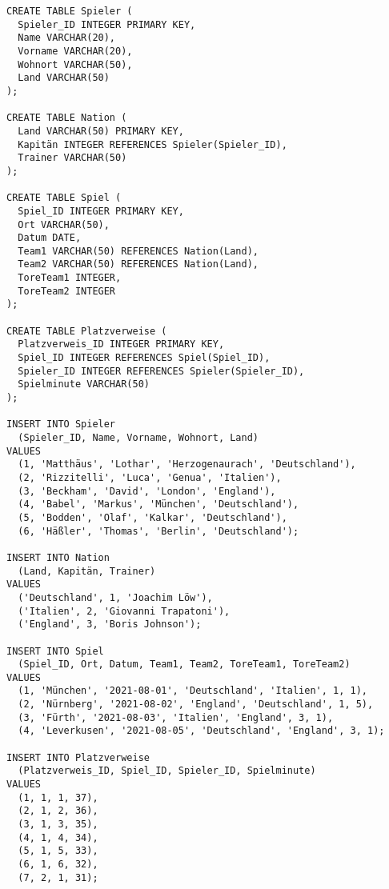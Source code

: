 \documentclass{lehramt-informatik-aufgabe}
\begin{document}
\begin{verbatim}
CREATE TABLE Spieler (
  Spieler_ID INTEGER PRIMARY KEY,
  Name VARCHAR(20),
  Vorname VARCHAR(20),
  Wohnort VARCHAR(50),
  Land VARCHAR(50)
);

CREATE TABLE Nation (
  Land VARCHAR(50) PRIMARY KEY,
  Kapitän INTEGER REFERENCES Spieler(Spieler_ID),
  Trainer VARCHAR(50)
);

CREATE TABLE Spiel (
  Spiel_ID INTEGER PRIMARY KEY,
  Ort VARCHAR(50),
  Datum DATE,
  Team1 VARCHAR(50) REFERENCES Nation(Land),
  Team2 VARCHAR(50) REFERENCES Nation(Land),
  ToreTeam1 INTEGER,
  ToreTeam2 INTEGER
);

CREATE TABLE Platzverweise (
  Platzverweis_ID INTEGER PRIMARY KEY,
  Spiel_ID INTEGER REFERENCES Spiel(Spiel_ID),
  Spieler_ID INTEGER REFERENCES Spieler(Spieler_ID),
  Spielminute VARCHAR(50)
);

INSERT INTO Spieler
  (Spieler_ID, Name, Vorname, Wohnort, Land)
VALUES
  (1, 'Matthäus', 'Lothar', 'Herzogenaurach', 'Deutschland'),
  (2, 'Rizzitelli', 'Luca', 'Genua', 'Italien'),
  (3, 'Beckham', 'David', 'London', 'England'),
  (4, 'Babel', 'Markus', 'München', 'Deutschland'),
  (5, 'Bodden', 'Olaf', 'Kalkar', 'Deutschland'),
  (6, 'Häßler', 'Thomas', 'Berlin', 'Deutschland');

INSERT INTO Nation
  (Land, Kapitän, Trainer)
VALUES
  ('Deutschland', 1, 'Joachim Löw'),
  ('Italien', 2, 'Giovanni Trapatoni'),
  ('England', 3, 'Boris Johnson');

INSERT INTO Spiel
  (Spiel_ID, Ort, Datum, Team1, Team2, ToreTeam1, ToreTeam2)
VALUES
  (1, 'München', '2021-08-01', 'Deutschland', 'Italien', 1, 1),
  (2, 'Nürnberg', '2021-08-02', 'England', 'Deutschland', 1, 5),
  (3, 'Fürth', '2021-08-03', 'Italien', 'England', 3, 1),
  (4, 'Leverkusen', '2021-08-05', 'Deutschland', 'England', 3, 1);

INSERT INTO Platzverweise
  (Platzverweis_ID, Spiel_ID, Spieler_ID, Spielminute)
VALUES
  (1, 1, 1, 37),
  (2, 1, 2, 36),
  (3, 1, 3, 35),
  (4, 1, 4, 34),
  (5, 1, 5, 33),
  (6, 1, 6, 32),
  (7, 2, 1, 31);
\end{verbatim}
\end{document}
